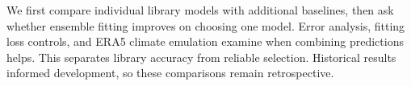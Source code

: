 We first compare individual library models with additional baselines, then
ask whether ensemble fitting improves on choosing one model. Error analysis,
fitting loss controls, and ERA5 climate emulation \citep{hersbach2020,niu2024}
examine when combining predictions helps. This separates library accuracy from
reliable selection. Historical results informed development, so these
comparisons remain retrospective.
